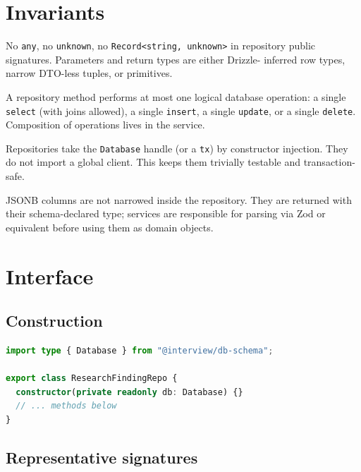 \section{Invariants}
\begin{invariant}
No \texttt{any}, no \texttt{unknown}, no \texttt{Record<string, unknown>} in
repository public signatures. Parameters and return types are either Drizzle-
inferred row types, narrow DTO-less tuples, or primitives.
\end{invariant}

\begin{invariant}
A repository method performs at most one logical database operation: a single
\texttt{select} (with joins allowed), a single \texttt{insert}, a single
\texttt{update}, or a single \texttt{delete}. Composition of operations lives
in the service.
\end{invariant}

\begin{invariant}
Repositories take the \texttt{Database} handle (or a \texttt{tx}) by
constructor injection. They do not import a global client. This keeps them
trivially testable and transaction-safe.
\end{invariant}

\begin{invariant}
JSONB columns are not narrowed inside the repository. They are returned with
their schema-declared type; services are responsible for parsing via Zod or
equivalent before using them as domain objects.
\end{invariant}

\section{Interface}

\subsection{Construction}

\begin{lstlisting}[language=TypeScript]
import type { Database } from "@interview/db-schema";

export class ResearchFindingRepo {
  constructor(private readonly db: Database) {}
  // ... methods below
}
\end{lstlisting}

\subsection{Representative signatures}

